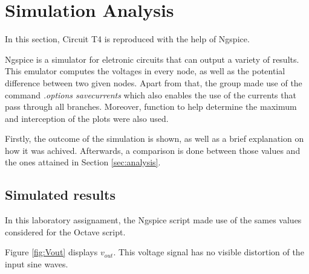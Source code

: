 
\section{Simulation Analysis}
\label{sec:simulation}



In this section, Circuit T4 is reproduced with the help of Ngspice.

Ngspice is a simulator for eletronic circuits that can output a variety of results.
This emulator computes the voltages in every node, as well as the potential difference
between two given nodes. Apart from that, the group made use of the command
{\em .options savecurrents} which also enables the use of the currents that pass
through all branches. Moreover, function to help determine the maximum and interception
of the plots were also used.

Firstly, the outcome of the simulation is shown, as well as a brief explanation
on how it was achived. Afterwards, a comparison is done between those values and
the ones attained in Section \ref{sec:analysis}.




\subsection{Simulated results}
\label{subsec:sim_res}

In this laboratory assignament, the Ngspice script made use of the sames values considered for
the Octave script.

Figure \ref{fig:Vout} displays $v_{out}$. This voltage signal has no visible distortion of the input sine waves.

